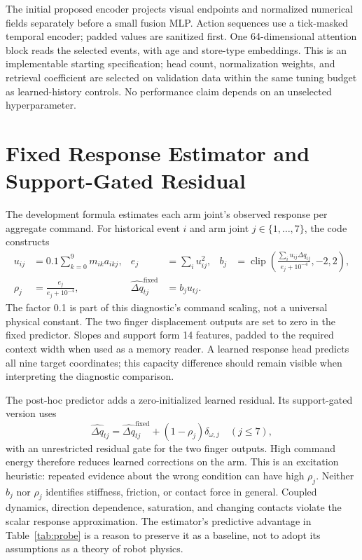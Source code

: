 \documentclass[10pt,letterpaper]{article}
\newcommand{\clip}{\operatorname{clip}}
\begin{document}
The initial proposed encoder projects visual endpoints and normalized numerical fields separately before a small fusion MLP. Action sequences use a tick-masked temporal encoder; padded values are sanitized first. One 64-dimensional attention block reads the selected events, with age and store-type embeddings. This is an implementable starting specification; head count, normalization weights, and retrieval coefficient are selected on validation data within the same tuning budget as learned-history controls. No performance claim depends on an unselected hyperparameter.

\section{Fixed Response Estimator and Support-Gated Residual}
\label{app:formula}
The development formula estimates each arm joint's observed response per aggregate command. For historical event $i$ and arm joint $j\in\{1,\ldots,7\}$, the code constructs
\begin{align}
 u_{ij}&=0.1\sum_{k=0}^{9}m_{ik}a_{ikj}, &
 e_j&=\sum_i u_{ij}^{2}, &
 b_j&=\clip\left(\frac{\sum_i u_{ij}\Delta q_{ij}}{e_j+10^{-4}},-2,2\right),
 \label{eq:formula}\\
 \rho_j&=\frac{e_j}{e_j+10^{-4}}, &
 \widehat{\Delta q}_{tj}^{\mathrm{fixed}}&=b_j u_{tj}. &&
 \label{eq:support}
\end{align}
The factor 0.1 is part of this diagnostic's command scaling, not a universal physical constant. The two finger displacement outputs are set to zero in the fixed predictor. Slopes and support form 14 features, padded to the required context width when used as a memory reader. A learned response head predicts all nine target coordinates; this capacity difference should remain visible when interpreting the diagnostic comparison.

The post-hoc predictor adds a zero-initialized learned residual. Its support-gated version uses
\begin{equation}
 \widehat{\Delta q}_{tj}=\widehat{\Delta q}_{tj}^{\mathrm{fixed}}
     +(1-\rho_j)\delta_{\omega,j}\quad (j\leq7),
 \label{eq:residual}
\end{equation}
with an unrestricted residual gate for the two finger outputs. High command energy therefore reduces learned corrections on the arm. This is an excitation heuristic: repeated evidence about the wrong condition can have high $\rho_j$. Neither $b_j$ nor $\rho_j$ identifies stiffness, friction, or contact force in general. Coupled dynamics, direction dependence, saturation, and changing contacts violate the scalar response approximation. The estimator's predictive advantage in Table~\ref{tab:probe} is a reason to preserve it as a baseline, not to adopt its assumptions as a theory of robot physics.
\end{document}
